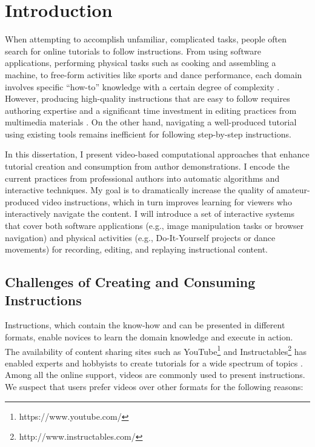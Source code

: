 \chapter{Introduction}

When attempting to accomplish unfamiliar, complicated tasks, people often search for online tutorials to follow instructions. From using software applications, performing physical tasks such as cooking and assembling a machine, to free-form activities like sports and dance performance, each domain involves specific ``how-to'' knowledge with a certain degree of complexity \cite{ryle1945knowhow}.
%
However, producing high-quality instructions that are easy to follow requires authoring expertise and a significant time investment in editing practices from multimedia materials \cite{Muller:2009tw}. On the other hand, navigating a well-produced tutorial using existing tools remains inefficient for following step-by-step instructions.

In this dissertation, I present video-based computational approaches that enhance tutorial creation and consumption from author demonstrations. I encode the current practices from professional authors into automatic algorithms and interactive techniques.
%
My goal is to dramatically increase the quality of amateur-produced video instructions, which in turn improves learning for viewers who interactively navigate the content. I will introduce a set of interactive systems that cover both software applications (e.g., image manipulation tasks or browser navigation) and physical activities (e.g., Do-It-Yourself projects or dance movements) for recording, editing, and replaying instructional content.


\section{Challenges of Creating and Consuming Instructions}

Instructions, which contain the know-how and can be presented in different formats, enable novices to learn the domain knowledge and execute in action. The availability of content sharing sites such as YouTube\footnote{https://www.youtube.com/} and Instructables\footnote{http://www.instructables.com/} has enabled experts and hobbyists to create tutorials for a wide spectrum of topics \cite{Lafreniere:2012tl}. Among all the online support, videos are commonly used to present instructions. We suspect that users prefer videos over other formats for the following reasons:

